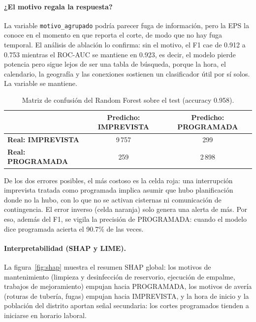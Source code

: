 \documentclass[11pt,a4paper]{article}
\begin{document}
\paragraph{¿El motivo regala la respuesta?} La variable \texttt{motivo\_agrupado}
podría parecer fuga de información, pero la EPS la conoce en el momento en que
reporta el corte, de modo que no hay fuga temporal. El análisis de ablación lo
confirma: sin el motivo, el F1 cae de 0.912 a 0.753 mientras el ROC-AUC se
mantiene en 0.923, es decir, el modelo pierde potencia pero sigue lejos de ser
una tabla de búsqueda, porque la hora, el calendario, la geografía y las
conexiones sostienen un clasificador útil por sí solos. La variable se mantiene.

\begin{table}[h]
      \centering
      \small
      \begin{tabular}{lcc}
            \toprule
                                      & \textbf{Predicho: IMPREVISTA} & \textbf{Predicho: PROGRAMADA} \\
            \midrule
            \textbf{Real: IMPREVISTA} & \cellcolor{green!12} 9\,757   & \cellcolor{red!15} 299        \\
            \textbf{Real: PROGRAMADA} & \cellcolor{orange!15} 259     & \cellcolor{green!12} 2\,898   \\
            \bottomrule
      \end{tabular}
      \caption{Matriz de confusión del Random Forest sobre el test (accuracy 0.958).}
      \label{tab:confusion}
\end{table}

De los dos errores posibles, el más costoso es la celda roja: una interrupción
imprevista tratada como programada implica asumir que hubo planificación donde
no la hubo, con lo que no se activan cisternas ni comunicación de contingencia.
El error inverso (celda naranja) solo genera una alerta de más. Por eso, además
del F1, se vigila la precisión de PROGRAMADA: cuando el modelo dice
\guillemotleft programada\guillemotright{} acierta el 90.7\% de las veces.

\paragraph{Interpretabilidad (SHAP y LIME).} La figura~\ref{fig:shap} muestra el
resumen SHAP global: los motivos de mantenimiento (limpieza y desinfección de
reservorio, ejecución de empalme, trabajos de mejoramiento) empujan hacia
PROGRAMADA, los motivos de avería (roturas de tubería, fugas) empujan hacia
IMPREVISTA, y la hora de inicio y la población del distrito aportan señal
secundaria: los cortes programados tienden a iniciarse en horario laboral.
\end{document}
